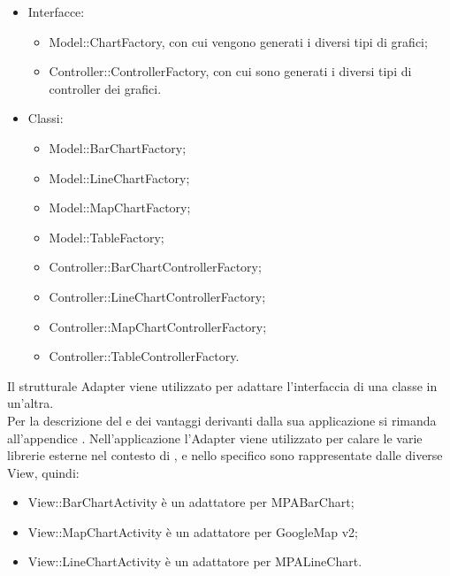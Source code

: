                 \begin{itemize}
                \item Interfacce:
                    \begin{itemize}
                        \item Model::ChartFactory, con cui vengono generati i diversi tipi di grafici;
                        \item Controller::ControllerFactory, con cui sono generati i diversi tipi di controller dei grafici.
                    \end{itemize}
                \item Classi:
                    \begin{itemize}
                        \item Model::BarChartFactory;
                        \item Model::LineChartFactory;
                        \item Model::MapChartFactory;
                        \item Model::TableFactory;
                        \item Controller::BarChartControllerFactory;
                        \item Controller::LineChartControllerFactory;
                        \item Controller::MapChartControllerFactory;
                        \item Controller::TableControllerFactory.
                    \end{itemize}
                \end{itemize}
            Il  strutturale Adapter viene utilizzato per adattare l'interfaccia di una classe in un'altra.\\
            Per la descrizione del  e dei vantaggi derivanti dalla sua applicazione si rimanda all'appendice .
                Nell'applicazione  l'Adapter viene utilizzato per calare le varie librerie esterne nel contesto di \projectname{}, e nello specifico sono rappresentate dalle diverse View, quindi:
                \begin{itemize}
                    \item View::BarChartActivity è un adattatore per MPABarChart;
                    \item View::MapChartActivity è un adattatore per GoogleMap   v2;
                    \item View::LineChartActivity è un adattatore per MPALineChart.
                \end{itemize}
